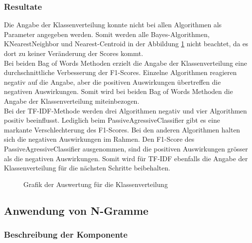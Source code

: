 \subsubsection{Resultate}
Die Angabe der Klassenverteilung konnte nicht bei allen Algorithmen als Parameter angegeben werden.
Somit werden alle Bayes-Algorithmen, KNearestNeighbor und Nearest-Centroid in der Abbildung \cref{abb:classweight} nicht beachtet, da es dort zu keiner Veränderung der Scores kommt.\\
Bei beiden \glqq Bag of Words\grqq{} Methoden erzielt die Angabe der Klassenverteilung eine durchschnittliche Verbesserung der F1-Scores.
Einzelne Algorithmen reagieren negativ auf die Angabe, aber die positiven Auswirkungen übertreffen die negativen Auswirkungen.
Somit wird bei beiden \glqq Bag of Words\grqq{} Methoden die Angabe der Klassenverteilung miteinbezogen.\\
Bei der TF-IDF-Methode werden drei Algorithmen negativ und vier Algorithmen positiv beeinflusst.
Lediglich beim PassiveAgressiveClassifier gibt es eine markante Verschlechterung des F1-Scores.
Bei den anderen Algorithmen halten sich die negativen Auswirkungen im Rahmen.
Den F1-Score des PassiveAgressiveClassifier ausgenommen, sind die positiven Auswirkungen grösser als die negativen Auswirkungen.
Somit wird für TF-IDF ebenfalls die Angabe der Klassenverteilung für die nächsten Schritte beibehalten.
\begin{figure}[H]	
	\setlength{\fboxsep}{0.3pt} 
	\setlength{\fboxrule}{0.3pt} 
	\caption{Grafik der Auswertung für die Klassenverteilung}
	\label{abb:classweight}
\end{figure}
\subsection{Anwendung von N-Gramme}
\subsubsection{Beschreibung der Komponente}
